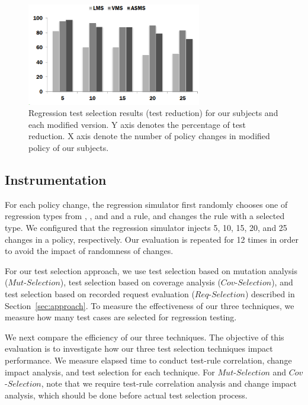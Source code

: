\begin{figure}[htbp]
    \centering
        \includegraphics[width=3.0in]{reduction.eps}
        \vspace{-5pt}
    \caption{\label{fig:reduction} Regression test selection results (test reduction) for our subjects and each modified version. Y axis
    denotes the percentage of test reduction. X axis denote the number of policy changes in modified policy of our subjects.}
    \vspace{-10pt}
\end{figure}

\subsection{Instrumentation}
For each policy change, the regression simulator first randomly chooses one of regression types from , ,
and  and a rule, and changes the rule with a selected type.
We configured that the regression simulator injects 5, 10, 15, 20, and 25 changes in a policy, respectively.
Our evaluation is repeated for 12 times in order to avoid the impact of randomness of changes.

For our test selection approach, we use test selection based on mutation analysis ($Mut$-$Selection$),
test selection based on coverage analysis ($Cov$-$Selection$), and
test selection based on recorded request evaluation ($Req$-$Selection$)
described in Section~\ref{sec:approach}.
To measure the effectiveness of our three techniques,
we measure how many test cases are selected for regression testing.

We next compare the efficiency of our three techniques.
The objective of this evaluation is to investigate how our three test selection techniques impact performance.
We measure elapsed time to conduct test-rule correlation,
change impact analysis, and test selection for each technique.
For $Mut$-$Selection$ and $Cov$-$Selection$, note that we require test-rule correlation analysis
and change impact analysis, which should be done before actual test selection process.

